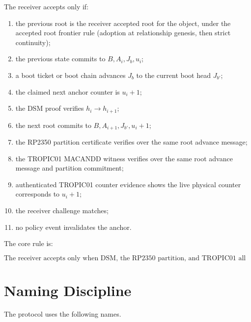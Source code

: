 \documentclass[11pt]{article}
\theoremstyle{definition}
\theoremstyle{remark}
\newcommand{\Bundle}{\ensuremath{B}}
\newcommand{\Ahead}{\ensuremath{A}}
\newcommand{\Bhead}{\ensuremath{J}}
\begin{document}
The receiver accepts only if:

\begin{enumerate}[label=(\arabic*),leftmargin=2em]
\item the previous root is the receiver accepted root for the object, under the accepted root
frontier rule (adoption at relationship genesis, then strict continuity);
\item the previous state commits to \(\Bundle,\Ahead_i,\Bhead_b,u_i\);
\item a boot ticket or boot chain advances \(\Bhead_b\) to the current boot head \(\Bhead_{b'}\);
\item the claimed next anchor counter is \(u_i+1\);
\item the DSM proof verifies \(h_i\rightarrow h_{i+1}\);
\item the next root commits to \(\Bundle,\Ahead_{i+1},\Bhead_{b'},u_i+1\);
\item the RP2350 partition certificate verifies over the same root advance message;
\item the TROPIC01 MACANDD witness verifies over the same root advance message and partition
commitment;
\item authenticated TROPIC01 counter evidence shows the live physical counter corresponds to
\(u_i+1\);
\item the receiver challenge matches;
\item no policy event invalidates the anchor.
\end{enumerate}

The core rule is:

\[
\boxed{
\text{The receiver accepts only when DSM, the RP2350 partition, and TROPIC01 all bind the same
root advance and fused anchor head.}
}
\]

\section{Naming Discipline}

The protocol uses the following names.
\end{document}

